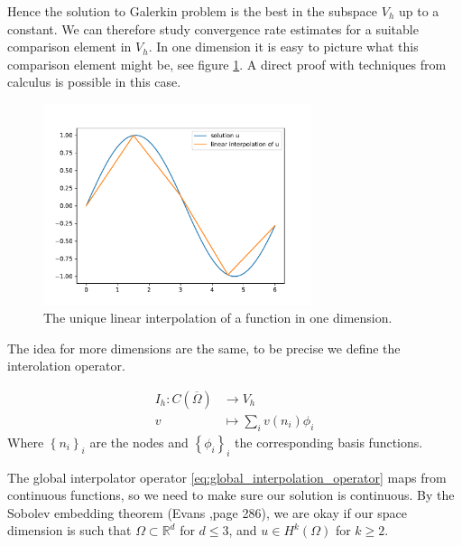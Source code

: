 \documentclass[../Main/main.tex]{subfiles}
\begin{document}
	Hence the solution to Galerkin problem is the best in the subspace $V_h$ up to a constant. We can therefore study convergence rate estimates for a suitable comparison element in $V_h$. In one dimension it is easy to picture what this comparison element might be, see figure \ref{fig:1dinterpolation}. A direct proof with techniques from calculus is possible in this case.\\
	\begin{figure}[H]
		\centering
		\includegraphics[width=0.7\textwidth]{interpolation.pdf}
		\caption{The unique linear interpolation of a function in one dimension.}
		\label{fig:1dinterpolation}
	\end{figure}
	The idea for more dimensions are the same, to be precise we define the interolation operator.
	\begin{definition}		\label{def:global_interpolator}
		\begin{equation}\label{eq:global_interpolation_operator}
		\begin{aligned}
			I_h: C(\overline{\Omega})& \rightarrow V_h \\
			v& \mapsto \sum_{i}v(n_i) \phi_i
		\end{aligned} 
		\end{equation}
	Where $\left\{ n_i\right \}_i$ are the nodes and $\left\{ \phi_i\right \}_i$ the corresponding basis functions.

	\end{definition}
	\begin{remark}
		The global interpolator operator \eqref{eq:global_interpolation_operator} maps from continuous functions, so we need to make sure our solution is continuous. By the Sobolev embedding theorem (Evans \cite{evans10},page 286), we are okay if our space dimension is such that $\Omega \subset \mathbb{R}^d$ for $d\leq3$, and $u \in H^k(\Omega)$ for $k\geq 2$.
	\end{remark}
\end{document}
